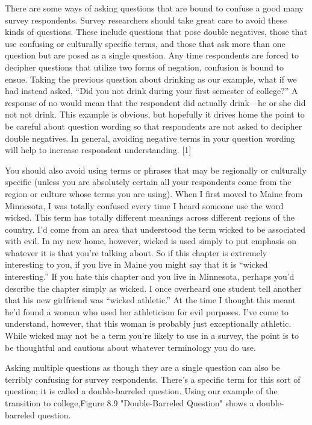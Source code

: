There are some ways of asking questions that are bound to confuse a good many survey respondents. Survey researchers should take great care to avoid these kinds of questions. These include questions that pose double negatives, those that use confusing or culturally specific terms, and those that ask more than one question but are posed as a single question. Any time respondents are forced to decipher questions that utilize two forms of negation, confusion is bound to ensue. Taking the previous question about drinking as our example, what if we had instead asked, “Did you not drink during your first semester of college?” A response of no would mean that the respondent did actually drink—he or she did not not drink. This example is obvious, but hopefully it drives home the point to be careful about question wording so that respondents are not asked to decipher double negatives. In general, avoiding negative terms in your question wording will help to increase respondent understanding. [1]

You should also avoid using terms or phrases that may be regionally or culturally specific (unless you are absolutely certain all your respondents come from the region or culture whose terms you are using). When I first moved to Maine from Minnesota, I was totally confused every time I heard someone use the word wicked. This term has totally different meanings across different regions of the country. I’d come from an area that understood the term wicked to be associated with evil. In my new home, however, wicked is used simply to put emphasis on whatever it is that you’re talking about. So if this chapter is extremely interesting to you, if you live in Maine you might say that it is “wicked interesting.” If you hate this chapter and you live in Minnesota, perhaps you’d describe the chapter simply as wicked. I once overheard one student tell another that his new girlfriend was “wicked athletic.” At the time I thought this meant he’d found a woman who used her athleticism for evil purposes. I’ve come to understand, however, that this woman is probably just exceptionally athletic. While wicked may not be a term you’re likely to use in a survey, the point is to be thoughtful and cautious about whatever terminology you do use.

Asking multiple questions as though they are a single question can also be terribly confusing for survey respondents. There’s a specific term for this sort of question; it is called a double-barreled question. Using our example of the transition to college,Figure 8.9 "Double-Barreled Question" shows a double-barreled question.

